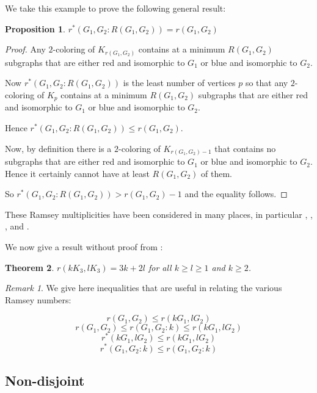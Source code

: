 \documentclass{article}
\newtheorem{thm}{Theorem}[section]
\newtheorem{prop}[thm]{Proposition}
\theoremstyle{definition}
\theoremstyle{remark}
\newtheorem{rem}{Remark}
\theoremstyle{definition}
\begin{document}
We take this example to prove the following general result:

\begin{prop}
    $r^{*}(G_1,G_2:R(G_1,G_2))= r(G_1,G_2)$
\end{prop}

\begin{proof}

    Any $2$-coloring of $K_{r(G_1,G_2)}$ contains at a minimum $R(G_1,G_2)$ subgraphs that are either red and isomorphic to $G_1$ or blue and isomorphic to $G_2$.

    Now $r^{*}(G_1,G_2:R(G_1,G_2))$ is the least number of vertices $p$ so that any $2$-coloring of $K_p$ contains at a minimum $R(G_1,G_2)$ subgraphs that are either red and isomorphic to $G_1$ or blue and isomorphic to $G_2$.

    Hence $r^{*}(G_1,G_2:R(G_1,G_2))\leq r(G_1,G_2)$.

    Now, by definition there is a $2$-coloring of $K_{r(G_1,G_2)-1}$ that contains no subgraphs that are either red and isomorphic to $G_1$ or blue and isomorphic to $G_2$. Hence it certainly cannot have at least $R(G_1,G_2)$ of them.

    So $r^{*}(G_1,G_2:R(G_1,G_2))>r(G_1,G_2)-1$ and the equality follows.
\end{proof}

These Ramsey multiplicities have been considered in many places, in particular \cite{burr1980ramsey}, \cite{conlon2007ramsey}, \cite{harary1974generalized}, and \cite{jacobson1980note}.


We now give a result without proof from \cite{burr1975ramsey}:


\begin{thm}
$r(kK_3,lK_3) =3k+2l$ for all $k\geq l\geq 1$ and $k\geq 2$.
\end{thm}



\begin{rem}
We give here inequalities that are useful in relating the various Ramsey numbers:

$$r(G_1,G_2)\leq r(kG_1,lG_2)$$
$$r(G_1,G_2)\leq r(G_1,G_2:k) \leq r(kG_1,lG_2)$$
$$r^{*}(kG_1,lG_2)\leq r(kG_1,lG_2)$$
$$r^{*}(G_1,G_2:k)\leq r(G_1,G_2:k)$$

\end{rem}

\subsection{Non-disjoint}
\end{document}
